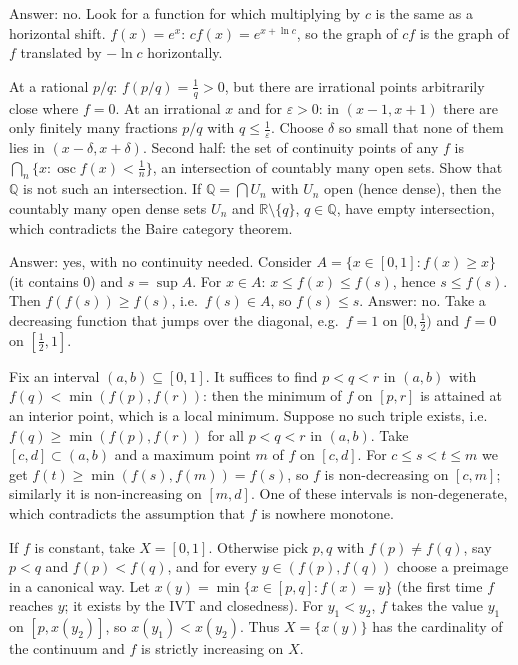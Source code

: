 \documentclass[11pt,a4paper]{article}
\begin{document}

 Answer: no. Look for a function for which multiplying by $c$ is the same as a horizontal shift.
 $f(x)=e^x$: $cf(x)=e^{x+\ln c}$, so the graph of $cf$ is the graph of $f$ translated by $-\ln c$ horizontally.

 At a rational $p/q$: $f(p/q)=\frac1q>0$, but there are irrational points arbitrarily close where $f=0$.
 At an irrational $x$ and for $\varepsilon>0$: in $(x-1,x+1)$ there are only finitely many fractions $p/q$ with $q\le\frac1\varepsilon$. Choose $\delta$ so small that none of them lies in $(x-\delta,x+\delta)$.
 Second half: the set of continuity points of any $f$ is $\bigcap_n\{x:\operatorname{osc}f(x)<\frac1n\}$, an intersection of countably many open sets. Show that $\mathbb Q$ is not such an intersection.
 If $\mathbb Q=\bigcap U_n$ with $U_n$ open (hence dense), then the countably many open dense sets $U_n$ and $\mathbb R\setminus\{q\}$, $q\in\mathbb Q$, have empty intersection, which contradicts the Baire category theorem.

 Answer: yes, with no continuity needed. Consider $A=\{x\in[0,1]:f(x)\ge x\}$ (it contains $0$) and $s=\sup A$.
 For $x\in A$: $x\le f(x)\le f(s)$, hence $s\le f(s)$. Then $f(f(s))\ge f(s)$, i.e.\ $f(s)\in A$, so $f(s)\le s$.
 Answer: no. Take a decreasing function that jumps over the diagonal, e.g.\ $f=1$ on $[0,\frac12)$ and $f=0$ on $[\frac12,1]$.

 Fix an interval $(a,b)\subseteq[0,1]$. It suffices to find $p<q<r$ in $(a,b)$ with $f(q)<\min(f(p),f(r))$: then the minimum of $f$ on $[p,r]$ is attained at an interior point, which is a local minimum.
 Suppose no such triple exists, i.e.\ $f(q)\ge\min(f(p),f(r))$ for all $p<q<r$ in $(a,b)$. Take $[c,d]\subset(a,b)$ and a maximum point $m$ of $f$ on $[c,d]$.
 For $c\le s<t\le m$ we get $f(t)\ge\min(f(s),f(m))=f(s)$, so $f$ is non-decreasing on $[c,m]$; similarly it is non-increasing on $[m,d]$. One of these intervals is non-degenerate, which contradicts the assumption that $f$ is nowhere monotone.

 If $f$ is constant, take $X=[0,1]$. Otherwise pick $p,q$ with $f(p)\ne f(q)$, say $p<q$ and $f(p)<f(q)$, and for every $y\in(f(p),f(q))$ choose a preimage in a canonical way.
 Let $x(y)=\min\{x\in[p,q]:f(x)=y\}$ (the first time $f$ reaches $y$; it exists by the IVT and closedness). For $y_1<y_2$, $f$ takes the value $y_1$ on $[p,x(y_2)]$, so $x(y_1)<x(y_2)$.
 Thus $X=\{x(y)\}$ has the cardinality of the continuum and $f$ is strictly increasing on $X$.
\end{document}
